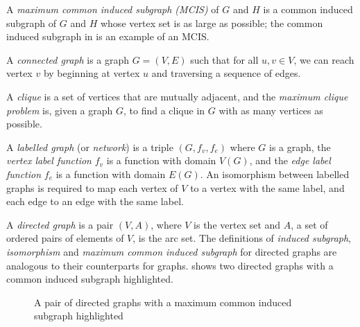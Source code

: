 A \emph{maximum common induced subgraph (MCIS)} of $G$ and $H$ is a common
induced subgraph of $G$ and $H$ whose vertex set is as large as possible; the
common induced subgraph in  is an example of an MCIS.

A \emph{connected graph} is a graph $G=(V,E)$ such that for all $u,v \in V$,
we can reach vertex $v$ by beginning at vertex $u$ and traversing a sequence
of edges.

A \emph{clique} is a set of vertices that are mutually adjacent, and the
\emph{maximum clique problem} is, given a graph $G$, to find a clique in $G$
with as many vertices as possible.

A \emph{labelled graph} (or \emph{network}) is a triple $(G, f_v, f_e)$
where $G$ is a graph,
the \emph{vertex label function} $f_v$ is a function with domain $V(G)$,
and the \emph{edge label function} $f_e$ is a function with domain $E(G)$.
An isomorphism between labelled graphs is required to map each vertex of
$V$ to a vertex with the same label, and each edge to an edge with the same label.

A \emph{directed graph} is a pair $(V,A)$, where $V$ is the vertex set and $A$,
a set of ordered pairs of elements of $V$, is the arc set.  The definitions of
\emph{induced subgraph}, \emph{isomorphism} and \emph{maximum common induced
subgraph} for directed graphs are analogous to their counterparts for graphs.
 shows two directed graphs with a common
induced subgraph highlighted.

\begin{figure}[h!]
\centering
{}
\qquad
{}
\caption{A pair of directed graphs with a maximum common induced subgraph highlighted}
\label{fig:directed-cis-example}
\end{figure}

